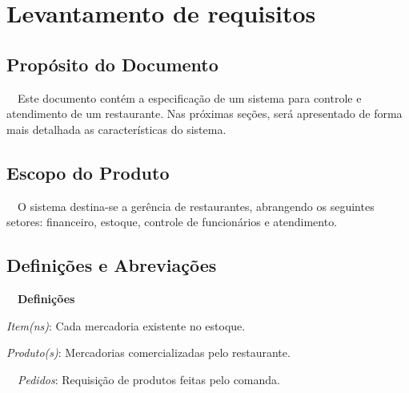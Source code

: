 
\clearpage\section[Levantamento de requisitos]{\textbf{\textcolor[rgb]{0.078431375,0.09411765,0.13725491}{Levantamento de requisitos}}}
\subsection[Propósito do Documento]{\textcolor[rgb]{0.078431375,0.09411765,0.13725491}{Propósito do Documento}}
{
\textcolor[rgb]{0.078431375,0.09411765,0.13725491}{\ \ Este documento contém a especificação de um sistema para controle
e atendimento de um restaurante. Nas próximas seções, será apresentado de forma mais detalhada as características do
sistema.}}

\subsection[Escopo do Produto]{\textcolor[rgb]{0.078431375,0.09411765,0.13725491}{Escopo do Produto}}
{
\textcolor[rgb]{0.078431375,0.09411765,0.13725491}{\ \ O sistema destina-se a gerência de restaurantes, abrangendo os
seguintes setores: financeiro, estoque, controle de funcionários e atendimento.}}

\subsection[Definições e Abreviações]{\textcolor[rgb]{0.078431375,0.09411765,0.13725491}{Definições e
Abreviações}}
{
\textcolor[rgb]{0.078431375,0.09411765,0.13725491}{\ \ }\textbf{\textcolor[rgb]{0.078431375,0.09411765,0.13725491}{Definições}}}

{
\textit{\textcolor[rgb]{0.078431375,0.09411765,0.13725491}{Item(ns)}}\textcolor[rgb]{0.078431375,0.09411765,0.13725491}{:
Cada mercadoria existente no estoque.}}

{
\textit{\textcolor[rgb]{0.078431375,0.09411765,0.13725491}{Produto(s)}}\textcolor[rgb]{0.078431375,0.09411765,0.13725491}{:
Mercadorias comercializadas pelo restaurante. }}

{
\textcolor[rgb]{0.078431375,0.09411765,0.13725491}{\ \ }\textit{\textcolor[rgb]{0.078431375,0.09411765,0.13725491}{Pedidos}}\textcolor[rgb]{0.078431375,0.09411765,0.13725491}{:
Requisição de produtos feitas pelo comanda.}}

